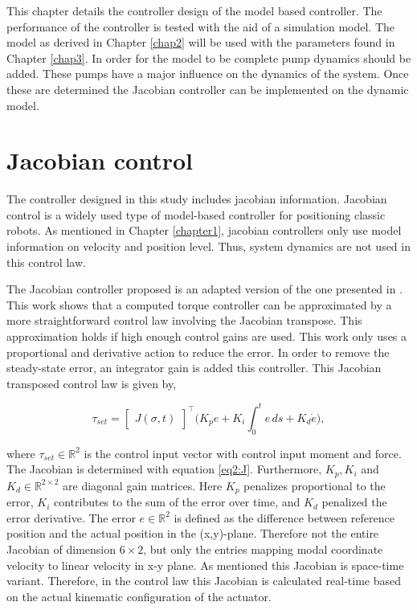 This chapter details the controller design of the model based controller. The performance of the controller is tested with the aid of a simulation model. The model as derived in Chapter \ref{chap2} will be used with the parameters found in Chapter \ref{chap3}. In order for the model to be complete pump dynamics should be added. These pumps have a major influence on the dynamics of the system. Once these are determined the Jacobian controller can be implemented on the dynamic model. 


\section{Jacobian control}


The controller designed in this study includes jacobian information. Jacobian control is a widely used type of model-based controller for positioning classic robots. As mentioned in Chapter \ref{chapter1}, jacobian controllers only use model information on velocity and position level. Thus, system dynamics are not used in this control law.


The Jacobian controller proposed is an adapted version of the one presented in \cite{MOOSAVIAN20071226}. This work shows that a computed torque controller can be approximated by a more straightforward control law involving the Jacobian transpose. This approximation holds if high enough control gains are used. This work only uses a proportional and derivative action to reduce the error. In order to remove the steady-state error, an integrator gain is added this controller. This Jacobian transposed control law is given by,


\begin{equation}
    \tau_{set} = \begin{bmatrix}J(\sigma,t)\end{bmatrix}^\top \Big(K_p e + K_i \int_0^t e \hspace{2pt} ds +  K_d \dot{e}\Big), 
    \label{eq:tau}
\end{equation}

where $\tau_{set} \in \mathbb{R}^2$ is the control input vector with control input moment and force. The Jacobian is determined with equation \ref{eq2:J}. Furthermore, $K_p,K_i $ and $K_d \in \mathbb{R}^{2\times 2}$ are diagonal gain matrices. Here $K_p$ penalizes proportional to the error, $K_i$ contributes to the sum of the error over time, and $K_d$ penalized the error derivative. The error $e \in \mathbb{R}^2$ is defined as the difference between reference position and the actual position in the (x,y)-plane. Therefore not the entire Jacobian of dimension $6 \times 2$, but only the entries mapping modal coordinate velocity to linear velocity in x-y plane. As mentioned this Jacobian is space-time variant. Therefore, in the control law this Jacobian is calculated real-time based on the actual kinematic configuration of the actuator. 

